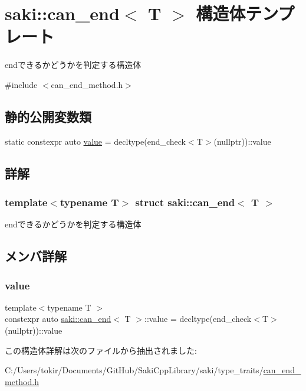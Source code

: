 \hypertarget{structsaki_1_1can__end}{}\section{saki\+:\+:can\+\_\+end$<$ T $>$ 構造体テンプレート}
\label{structsaki_1_1can__end}


endできるかどうかを判定する構造体  




{\ttfamily \#include $<$can\+\_\+end\+\_\+method.\+h$>$}

\subsection*{静的公開変数類}
\begin{DoxyCompactItemize}
\item 
static constexpr auto \mbox{\hyperlink{structsaki_1_1can__end_a5448d219fb1809d8e1bb40ffe2361056}{value}} = decltype(end\+\_\+check$<$T$>$(nullptr))\+::value
\end{DoxyCompactItemize}


\subsection{詳解}
\subsubsection*{template$<$typename T$>$\newline
struct saki\+::can\+\_\+end$<$ T $>$}

endできるかどうかを判定する構造体 

\subsection{メンバ詳解}
\mbox{\label{structsaki_1_1can__end_a5448d219fb1809d8e1bb40ffe2361056}} 
\subsubsection{\texorpdfstring{value}{value}}
{\footnotesize\ttfamily template$<$typename T $>$ \\
constexpr auto \mbox{\hyperlink{structsaki_1_1can__end}{saki\+::can\+\_\+end}}$<$ T $>$\+::value = decltype(end\+\_\+check$<$T$>$(nullptr))\+::value\hspace{0.3cm}{\ttfamily [static]}}



この構造体詳解は次のファイルから抽出されました\+:\begin{DoxyCompactItemize}
\item 
C\+:/\+Users/tokir/\+Documents/\+Git\+Hub/\+Saki\+Cpp\+Library/saki/type\+\_\+traits/\mbox{\hyperlink{can__end__method_8h}{can\+\_\+end\+\_\+method.\+h}}\end{DoxyCompactItemize}
